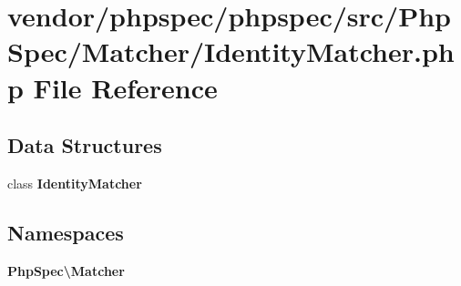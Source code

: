 \section{vendor/phpspec/phpspec/src/\+Php\+Spec/\+Matcher/\+Identity\+Matcher.php File Reference}
\label{_identity_matcher_8php}
\subsection*{Data Structures}
\begin{DoxyCompactItemize}
\item 
class {\bf Identity\+Matcher}
\end{DoxyCompactItemize}
\subsection*{Namespaces}
\begin{DoxyCompactItemize}
\item 
 {\bf Php\+Spec\textbackslash{}\+Matcher}
\end{DoxyCompactItemize}
